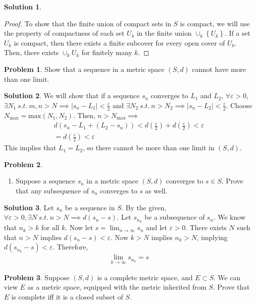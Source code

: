\documentclass[12pt]{article}
\theoremstyle{definition} %
\newtheorem{solution}{Solution}
\newtheorem{problem}{Problem}
\theoremstyle{plain} %
\begin{document}
\begin{solution}
   \begin{proof}
    To show that the finite union of compact sets in $S$ is compact, we will use the property of compactness of each set $U_k$ in the finite union $\cup_k \left\{  U_k\right\} $. 
    If a set $U_k$ is compact, then there exists a finite subcover for every open cover of $U_k$. Then, there exists $\cup_k U_k$ for finitely many $k$.
   \end{proof} 
\end{solution}

\begin{problem}
    Show that a sequence in a metric space $(S,d)$ cannot have more than one limit.
\end{problem}

\begin{solution}
   We will show that if a sequence $s_{n} $ converges to $L_{1} $ and $L_{2} $, $\forall \varepsilon >0$, $\exists N_{1}\ s.t. \ m,n >N \implies \left\vert s_{n} -L_{1}   \right\vert <\frac{\varepsilon}{2}$ and $\exists N_{2} \ s.t. \ n>N_{2} \implies \left\vert s_{n} -L_{2}  \right\vert <\frac{\varepsilon}{2}$. Choose $N_{\text{max} }=\text{max}(N_{1},N_{2} )  $. Then, $n>N_{\text{max} } \implies $
   \begin{align}
    d\left( s_{n}  -L_{1}  + (L_{2}-s_{n}) \right)  <  d\left( \frac{\varepsilon}{2} \right)  +  d\left( \frac{\varepsilon}{2} \right)< \varepsilon \\[10pt] 
   =  d\left( \frac{\varepsilon}{2} \right) <\varepsilon 
   \end{align}
   This implies that $L_{1} =L_{2} $, so there cannot be more than one limit in $(S,d)$. 
\end{solution}

\begin{problem}
    \begin{enumerate}
        \item Suppose a sequence $s_{n} $ in a metric space $(S,d)$ converges to $s\in S$. Prove that any subsequence of $s_{n} $ converges to $s$ as well.
    \end{enumerate}
\end{problem}

\begin{solution}
    Let $s_{n} $ be a sequence in $S$. By the given, $\forall \varepsilon >0,\exists N\ s.t. \ n>N\implies d(s_{n}-s)$. Let $s_{n_{k}} $ be a subsequence of $s_{n} $. We know that $n_{k} >k$ for all $k$. 
    Now let $s=\lim_{n \to \infty} s_{n} $ and let $\varepsilon >0$. There exists $N$ such that $n>N$ implies $d(s_{n} -s)<\varepsilon $. Now $k>N$ implies $n_{k} >N$, implying $d(s_{n_{k} }-s )<\varepsilon $. Therefore,
    \begin{align}
        \lim_{k \to \infty} s_{n_{k} }=s 
    \end{align}   
\end{solution}
\begin{problem}
    Suppose $(S,d)$ is a complete metric space, and $E \subset S$. We can view $E$ as a metric space, equipped with the metric inherited from $S$. Prove that $E$ is complete iff it is a closed subset of $S$. 
\end{problem}
\end{document}
